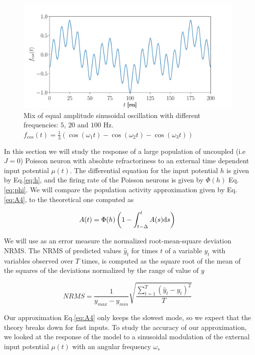 \documentclass[12pt,twoside]{report}
\def \dd  {{\rm d}}
\begin{document}
\begin{figure}[h!]
	\centering
	\includegraphics[width=0.8\linewidth]{fcos.pdf}
	\caption{Mix of equal amplitude sinusoidal oscillation with different frequencies: $5$, $20$ and $100$ Hz. $f_{cos}(t)=\frac{1}{3}\left(\cos(\omega_1t)-\cos(\omega_2t)-\cos(\omega_3t)\right)$
	}
	\label{fig:fcos}
\end{figure}


In this section we will study the response of a large population of uncoupled (i.e $J=0$) Poisson neuron with absolute refractoriness to an external time dependent input potential $\mu(t)$. The differential equation for the input potential $h$ is given by Eq.\eqref{eq:h}, and the firing rate of the Poisson neurons is given by $\Phi(h)$ Eq.\eqref{eq:phi}. We will compare the population activity approximation given by Eq.\eqref{eq:A4}, to the theoretical one computed as

\begin{equation}
A(t)=\Phi(h)\left(1-\int_{t-\Delta}^t A(s)\dd s\right)
\end{equation}

We will use as an error measure the normalized root-mean-square deviation NRMS.
The NRMS of predicted values $\hat {y}_t$ for times $t$ of a variable $y_t$ with variables observed over $T$ times, is computed as the square root of the mean of the squares of the deviations normalized by the range of value of $y$

\begin{equation}
\label{eq:NRMS}
NRMS=\frac{1}{y_{max}-y_{min}}\sqrt{\frac{\sum_{t=1}^T(\hat{y}_t-y_t)^2}{T}}
\end{equation}

Our approximation Eq.\eqref{eq:A4} only keeps the slowest mode, so we expect that the theory breaks down for fast inputs. To study the accuracy of our approximation, we looked at the response of the model to a sinusoidal modulation of the external input potential $\mu(t)$ with an angular frequency $\omega_s$ 
\end{document}
